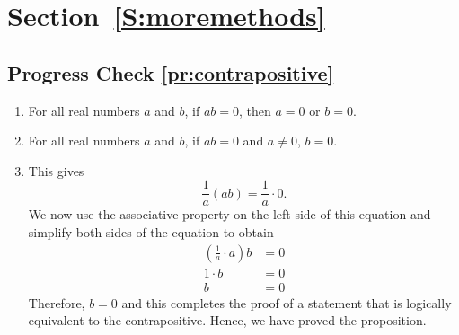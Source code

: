 \section*{Section~\ref{S:moremethods}}

\subsection*{Progress Check \ref{pr:contrapositive}}
\begin{enumerate}
\item For all real numbers $a$ and $b$, if  $ab = 0$, then  $a = 0\text{  or  }b = 0$.

\item For all real numbers $a$ and $b$, if  $ab = 0$ and $a \ne 0$, $b = 0$.

\item This gives
\[
\frac{1}{a} (ab) = \frac{1}{a} \cdot 0.
\]
We now use the associative property on the left side of this equation and simplify both sides of the equation to obtain
\begin{align*}
\left( \frac{1}{a} \cdot a \right)b &= 0 \\
1 \cdot b &= 0 \\
        b &= 0
\end{align*}
Therefore, $b = 0$ and this completes the proof of a statement that is logically equivalent to the contrapositive.  Hence, we have proved the proposition.
\end{enumerate}
\hbreak



\endinput

